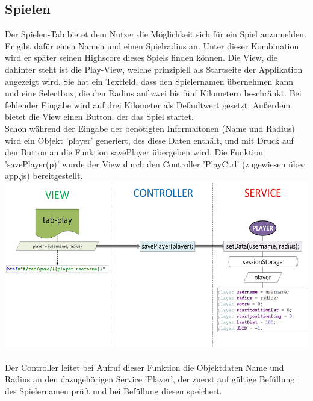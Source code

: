 \subsection{Spielen}
Der Spielen-Tab bietet dem Nutzer die Möglichkeit sich für ein Spiel anzumelden. Er gibt dafür einen Namen und einen Spielradius an. Unter dieser Kombination wird er später seinen Highscore dieses Spiels finden können. Die View, die dahinter steht ist die Play-View, welche prinzipiell als Startseite der Applikation angezeigt wird. Sie hat ein Textfeld, dass den Spielernamen übernehmen kann und eine Selectbox, die den Radius auf zwei bis fünf Kilometern beschränkt. Bei fehlender Eingabe wird auf drei Kilometer als Defaultwert gesetzt. Außerdem bietet die View einen Button, der das Spiel startet. 
\\
Schon während der Eingabe der benötigten Informaitonen (Name und Radius) wird ein Objekt 'player' generiert, des diese Daten enthält, und mit Druck auf den Button an die Funktion savePlayer übergeben wird. Die Funktion 'savePlayer(p)' wurde der View durch den Controller 'PlayCtrl' (zugewiesen über app.js) bereitgestellt.
\\
\includegraphics[width=1\textwidth]{ref/images/play.png} \\ 
\\
Der Controller leitet bei Aufruf dieser Funktion die Objektdaten Name und Radius an den dazugehörigen Service 'Player', der zuerst auf gültige Befüllung des Spielernamen prüft und bei Befüllung diesen speichert.